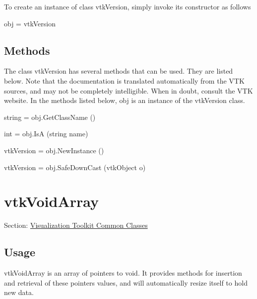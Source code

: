 To create an instance of class vtk\-Version, simply invoke its constructor as follows \begin{DoxyVerb}  obj = vtkVersion
\end{DoxyVerb}
 \hypertarget{vtkwidgets_vtkxyplotwidget_Methods}{}\subsection{Methods}\label{vtkwidgets_vtkxyplotwidget_Methods}
The class vtk\-Version has several methods that can be used. They are listed below. Note that the documentation is translated automatically from the V\-T\-K sources, and may not be completely intelligible. When in doubt, consult the V\-T\-K website. In the methods listed below, {\ttfamily obj} is an instance of the vtk\-Version class. 
\begin{DoxyItemize}
\item {\ttfamily string = obj.\-Get\-Class\-Name ()}  
\item {\ttfamily int = obj.\-Is\-A (string name)}  
\item {\ttfamily vtk\-Version = obj.\-New\-Instance ()}  
\item {\ttfamily vtk\-Version = obj.\-Safe\-Down\-Cast (vtk\-Object o)}  
\end{DoxyItemize}\hypertarget{vtkcommon_vtkvoidarray}{}\section{vtk\-Void\-Array}\label{vtkcommon_vtkvoidarray}
Section\-: \hyperlink{sec_vtkcommon}{Visualization Toolkit Common Classes} \hypertarget{vtkwidgets_vtkxyplotwidget_Usage}{}\subsection{Usage}\label{vtkwidgets_vtkxyplotwidget_Usage}
vtk\-Void\-Array is an array of pointers to void. It provides methods for insertion and retrieval of these pointers values, and will automatically resize itself to hold new data.

